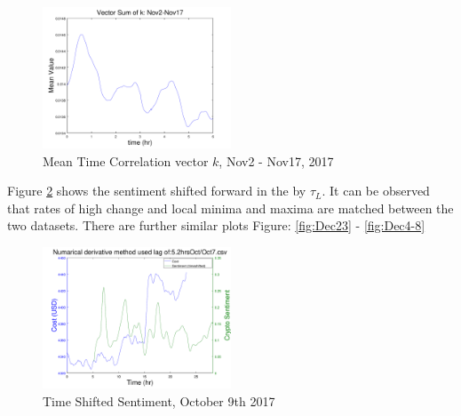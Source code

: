 \documentclass[12pt,journal,compsoc]{IEEEtran}
\begin{document}
\begin{figure}[h]
	\centering
	\includegraphics[width=0.5\textwidth]{../Datasets/Plots/VectorSumk}
	\caption{Mean Time Correlation vector $k$, Nov2 - Nov17, 2017}
	\label{fig:Ksum}
\end{figure}

Figure \ref{fig:SentShift} shows the sentiment shifted forward in the by $\tau_L$. It can be observed that 
rates of high change and local minima and maxima are matched between the two datasets. There are further similar plots 
Figure: \ref{fig:Dec23} - \ref{fig:Dec4-8} 

\begin{figure}[h]
	\centering
	\includegraphics[width=0.5\textwidth]{../Datasets/Plots/Oct7_CostSen}
	\caption{Time Shifted Sentiment, October 9th 2017}
	\label{fig:SentShift}
\end{figure}
\end{document}
